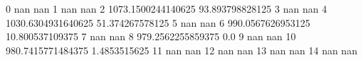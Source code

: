 0 nan nan
1 nan nan
2 1073.1500244140625 93.893798828125
3 nan nan
4 1030.6304931640625 51.374267578125
5 nan nan
6 990.0567626953125 10.800537109375
7 nan nan
8 979.2562255859375 0.0
9 nan nan
10 980.7415771484375 1.4853515625
11 nan nan
12 nan nan
13 nan nan
14 nan nan
